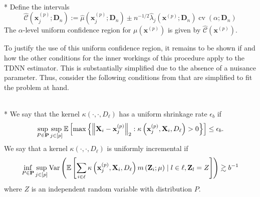 \begin{boxD}
	\begin{thm}\mbox{}\\*
		Define the intervals
		\begin{equation}
			\hat{\mathcal{C}}\left(\mathbf{x}^{(p)}_j; \mathbf{D}_n\right)
			:= \hat{\mu}\left(\mathbf{x}^{(p)}_{j}; \mathbf{D}_n\right) \pm
			n^{-1/2} \hat{\lambda}_{j}\left(\mathbf{x}^{(p)}; \mathbf{D}_n\right)\operatorname{cv}\left(\alpha; \mathbf{D}_n\right)
		\end{equation}
		The $\alpha$-level uniform confidence region for $\mu\left(\mathbf{x}^{(p)}\right)$ is given by $\hat{\mathcal{C}}\left(\mathbf{x}^{(p)}\right)$.
	\end{thm}
\end{boxD}

To justify the use of this uniform confidence region, it remains to be shown if and how the other conditions for the inner workings of this procedure apply to the TDNN estimator.
This is substantially simplified due to the absence of a nuisance parameter.
Thus, consider the following conditions from \cite{ritzwoller_uniform_2024} that are simplified to fit the problem at hand.

\begin{boxD}
	\begin{dfn}\mbox{}\\*
		We say that the kernel $\kappa\left(\cdot, \cdot, D_{\ell}\right)$ has a uniform shrinkage rate $\epsilon_b$ if
		\begin{equation}
			\sup_{P \in \mathbf{P}} \sup_{j \in[p]}
			\mathbb{E}\left[\max \left\{\left\|\mathbf{X}_i-\mathbf{x}^{(p)}_{j}\right\|_{2}: \kappa\left(\mathbf{x}^{(p)}_{j}, \mathbf{X}_i, D_{\ell}\right)>0\right\}\right]
			\leq \epsilon_b .
		\end{equation}
		We say that a kernel $\kappa\left(\cdot, \cdot, D_{\ell}\right)$ is uniformly incremental if
		\begin{equation}
			\inf_{P \in \mathbf{P}} \sup_{j \in[p]}
			\text{Var}\left(\mathbb{E}\left[\sum_{i \in \ell} \kappa\left(\mathbf{x}^{(p)}_{j}, \mathbf{X}_i, D_{\ell}\right) m\left(\mathbf{Z}_i ; \mu\right) \mid l \in \ell, \mathbf{Z}_l = Z\right]\right)
			\gtrsim b^{-1}
		\end{equation}
		where $Z$ is an independent random variable with distribution $P$.
	\end{dfn}
\end{boxD}

